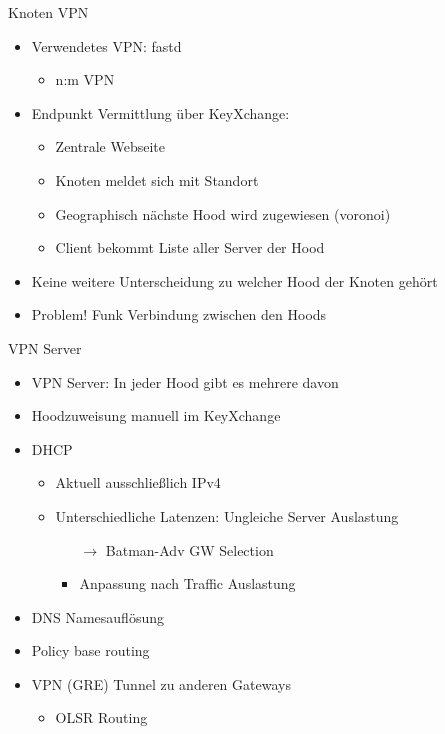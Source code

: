 \begin{frame}{Knoten VPN}
    \begin{itemize}
        \item Verwendetes VPN: fastd
        \begin{itemize}
            \item n:m VPN
        \end{itemize}
        \item Endpunkt Vermittlung über KeyXchange:
        \begin{itemize}
            \item Zentrale Webseite 
            \item Knoten meldet sich mit Standort
            \item Geographisch nächste Hood wird zugewiesen (voronoi)
            \item Client bekommt Liste aller Server der Hood
        \end{itemize}
        \item<3> Keine weitere Unterscheidung zu welcher Hood der Knoten gehört
        \item<3> {\color{red}Problem!} Funk Verbindung zwischen den Hoods
    \end{itemize}
\end{frame}

\begin{frame}{VPN Server}
    \begin{itemize}
        \item VPN Server: In jeder Hood gibt es mehrere davon
        \item Hoodzuweisung manuell im KeyXchange
        \item DHCP
        \begin{itemize}
            \item Aktuell ausschließlich IPv4
            \item Unterschiedliche Latenzen: Ungleiche Server Auslastung
            \begin{itemize}
                \item[$\rightarrow$] Batman-Adv GW Selection
                \item Anpassung nach Traffic Auslastung
            \end{itemize}
        \end{itemize}
        \item DNS Namesauflösung
        \item Policy base routing
        \item VPN (GRE) Tunnel zu anderen Gateways
        \begin{itemize}
            \item OLSR Routing
        \end{itemize}
    \end{itemize}
\end{frame}

